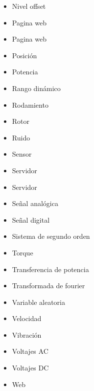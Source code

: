 \begin{itemize}
    \item Nivel offset
    \item Pagina web
    \item Pagina web
    \item Posición
    \item Potencia
    \item Rango dinámico
    \item Rodamiento
    \item Rotor
    \item Ruido
    \item Sensor
    \item Servidor
    \item Servidor
    \item Señal analógica
    \item Señal digital
    \item Sistema de segundo orden
    \item Torque
    \item Transferencia de potencia
    \item Transformada de fourier
    \item Variable aleatoria
    \item Velocidad
    \item Vibración
    \item Voltajes AC
    \item Voltajes DC
    \item Web
\end{itemize}


